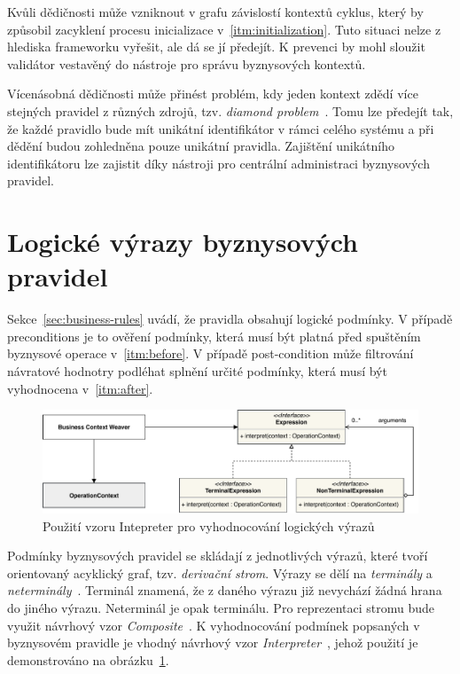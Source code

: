 Kvůli dědičnosti může vzniknout v grafu závislostí kontextů cyklus, který by způsobil zacyklení
procesu inicializace v~\ref{itm:initialization}. Tuto situaci nelze z hlediska frameworku vyřešit,
ale dá se jí předejít. K prevenci by mohl sloužit validátor vestavěný do nástroje pro správu
byznysových kontextů.

Vícenásobná dědičnosti může přinést problém, kdy jeden kontext zdědí více stejných pravidel z
různých zdrojů, tzv. \textit{diamond problem}~\cite{boyen1994generalized}. Tomu lze předejít tak, že
každé pravidlo bude mít unikátní identifikátor v rámci celého systému a při dědění budou zohledněna
pouze unikátní pravidla. Zajištění unikátního identifikátoru lze zajistit díky nástroji pro centrální
administraci byznysových pravidel.

\section{Logické výrazy byznysových pravidel}

Sekce~\ref{sec:business-rules} uvádí, že pravidla obsahují logické podmínky. V případě preconditions je to
ověření podmínky, která musí být platná před spuštěním byznysové operace v~\ref{itm:before}. V případě
post-condition může filtrování návratové hodnotry podléhat splnění určité podmínky, která musí být
vyhodnocena v~\ref{itm:after}.

\begin{figure}
    \centering
    \includegraphics[keepaspectratio=true, width=1\linewidth]{figures/expression.pdf}
    \caption{Použití vzoru Intepreter pro vyhodnocování logických výrazů}
    \label{fig:expression}
\end{figure}

Podmínky byznysových pravidel se skládají z jednotlivých výrazů, které tvoří
orientovaný acyklický graf, tzv. \textit{derivační strom}.
Výrazy se dělí na \textit{terminály} a \textit{neterminály}~\cite{melichar2003jazyky}.
Terminál znamená, že z daného výrazu již nevychází žádná hrana do jiného výrazu.
Neterminál je opak terminálu. Pro reprezentaci stromu bude využit návrhový vzor
\textit{Composite}~\cite{fowler2002patterns}. K vyhodnocování podmínek popsaných v byznysovém
pravidle je vhodný návrhový vzor \textit{Interpreter}~\cite{fowler2002patterns}, jehož
použití je demonstrováno na obrázku~\ref{fig:expression}.


